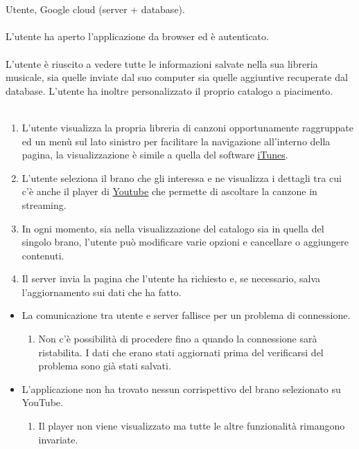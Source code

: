 \newpage
\vspace*{0.5cm}
\\\\
 Utente, Google cloud (server + database). \\\\
 L'utente ha aperto l'applicazione da browser ed \`e
autenticato. \\\\ 
 L'utente \`e riuscito a vedere tutte le informazioni
salvate nella sua libreria musicale, sia quelle inviate dal suo computer sia
quelle aggiuntive recuperate dal database. L'utente ha inoltre
personalizzato il proprio catalogo a piacimento. \\\\
\begin{enumerate}
  \item L'utente visualizza la propria libreria di canzoni
  opportunamente raggruppate ed un men\`u sul lato sinistro per facilitare la
  navigazione all'interno della pagina, la visualizzazione \`e simile a quella
  del software \underline{iTunes}.
  \item L'utente seleziona il brano che gli interessa e ne visualizza i
  dettagli tra cui c'\`e anche il player di \underline{Youtube} che permette di ascoltare la
  canzone in streaming.
  \item In ogni momento, sia nella visualizzazione del catalogo sia in quella
  del singolo brano, l'utente pu\`o modificare varie opzioni e cancellare o
  aggiungere contenuti.
  \item Il server invia la pagina che l'utente ha richiesto e, se necessario,
  salva l'aggiornamento sui dati che ha fatto.
\end{enumerate}
\begin{itemize}
  \item La comunicazione tra utente e server fallisce per un problema di
  connessione.
  \begin {enumerate}
    \item Non c'\`e possibilit\`a di procedere fino a quando la connessione sar\`a
    ristabilita. I dati che erano stati aggiornati prima del verificarsi del
    problema sono gi\`a stati salvati.
  \end{enumerate}
  \item L'applicazione non ha trovato nessun corrispettivo del brano
  selezionato su YouTube.
  \begin {enumerate}
    \item Il player non viene visualizzato ma tutte le altre funzionalit\`a
    rimangono invariate.
  \end{enumerate}
\end{itemize}
\newpage


